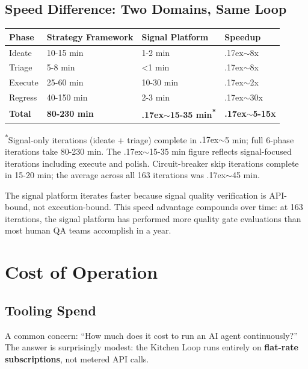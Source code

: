 \documentclass[11pt,a4paper]{article}
\newcounter{none} %
\newcommand{\roughly}{{\textraisebox{.17ex}{$\scriptstyle\sim$}}}
\newcommand{\textraisebox}[2]{\leavevmode\raise#1\hbox{#2}}
\begin{document}
\subsection{Speed Difference: Two Domains, Same Loop}\label{sec:speed-difference-two-domains-same-loop}

{\def\LTcaptype{none} %
\begin{longtable}[]{@{}llll@{}}
\toprule\noalign{}
Phase & Strategy Framework & Signal Platform & Speedup \\
\midrule\noalign{}
\endhead
\bottomrule\noalign{}
\endlastfoot
Ideate & 10-15 min & 1-2 min & \roughly8x \\
Triage & 5-8 min & \textless1 min & \roughly8x \\
Execute & 25-60 min & 10-30 min & \roughly2x \\
Regress & 40-150 min & 2-3 min & \roughly30x \\
\textbf{Total} & \textbf{80-230 min} & \textbf{\roughly15-35 min\textsuperscript{*}} & \textbf{\roughly5-15x} \\
\end{longtable}
}

\textsuperscript{*}Signal-only iterations (ideate + triage) complete in \roughly5 min; full 6-phase iterations take 80-230 min. The \roughly15-35 min figure reflects signal-focused iterations including execute and polish. Circuit-breaker skip iterations complete in 15-20 min; the average across all 163 iterations was \roughly45 min.

\vspace{4pt}
The signal platform iterates faster because signal quality verification is API-bound, not execution-bound. This speed advantage compounds over time: at 163 iterations, the signal platform has performed more quality gate evaluations than most human QA teams accomplish in a year.


\section{Cost of Operation}\label{sec:cost-of-operation}

\subsection{Tooling Spend}\label{sec:tooling-spend}

A common concern: ``How much does it cost to run an AI agent continuously?'' The answer is surprisingly modest: the Kitchen Loop runs entirely on \textbf{flat-rate subscriptions}, not metered API calls.
\end{document}
